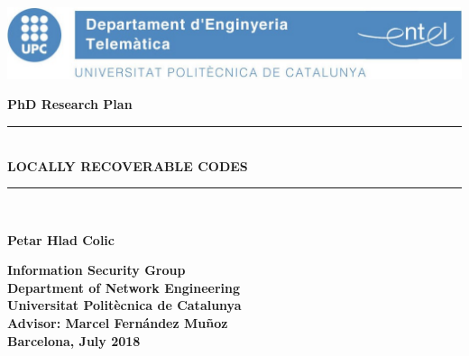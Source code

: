 \documentclass[12pt,a4paper,twoside,openright]{book}
\begin{document}
\newcommand{\titol}{Locally Recoverable Codes}
\newcommand{\shortitol}{LRC Codes}
\newcommand{\autor}{Petar Hlad Colic}

\frontmatter
\begin{titlepage}
   	\includegraphics[scale=0.3]{images/entel_logo.jpg}

   	\begin{center}
   	\vspace{2em}
   	\Large\textbf{\textbf{PhD Research Plan}}\\
   	\vspace{3em}
   	\rule{\linewidth}{0.5pt}\\
   	\LARGE\textbf{\MakeUppercase{\titol}} \\
   	\rule{\linewidth}{0.5pt}\\
   	\vspace{3em}
   	
   	\LARGE\textbf{\autor}\\
   	\vspace{3em}
   	
    \Large\textbf{Information Security Group}\\
    \Large\textbf{Department of Network Engineering}\\
   	\Large\textbf{Universitat Politècnica de Catalunya}\\
   	
   	
   	\vspace{2em}
   	\Large\textbf{Advisor: Marcel Fern\'andez Muñoz}\\
   	\vspace{3em}
   	\large\textbf{Barcelona, July 2018}\\
   	\end{center}
\end{titlepage} 

\clearpage{\thispagestyle{empty}\cleardoublepage}
\tableofcontents
\clearpage{\thispagestyle{empty}\cleardoublepage}
\pagestyle{fancy}
\setlength{\parskip}{3mm plus1mm minus1.5mm}
\mainmatter


\clearpage{\thispagestyle{empty}\cleardoublepage}

\clearpage{\thispagestyle{empty}\cleardoublepage}


%

%

\clearpage{\thispagestyle{empty}\cleardoublepage}
{}
\printbibliography
\end{document}
